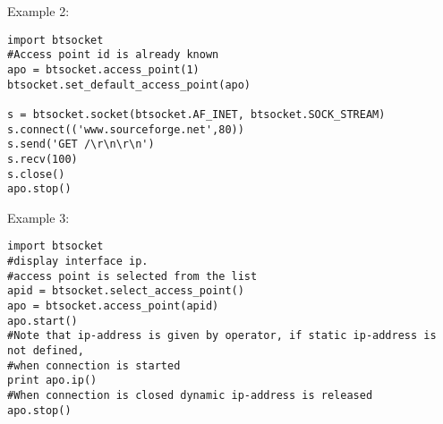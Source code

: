 Example 2:
\begin{verbatim}
import btsocket
#Access point id is already known
apo = btsocket.access_point(1)
btsocket.set_default_access_point(apo) 

s = btsocket.socket(btsocket.AF_INET, btsocket.SOCK_STREAM)
s.connect(('www.sourceforge.net',80))
s.send('GET /\r\n\r\n')
s.recv(100)
s.close()
apo.stop()
\end{verbatim}

Example 3:
\begin{verbatim}
import btsocket
#display interface ip.
#access point is selected from the list
apid = btsocket.select_access_point()
apo = btsocket.access_point(apid)
apo.start()
#Note that ip-address is given by operator, if static ip-address is not defined,
#when connection is started
print apo.ip()
#When connection is closed dynamic ip-address is released
apo.stop()
\end{verbatim}

